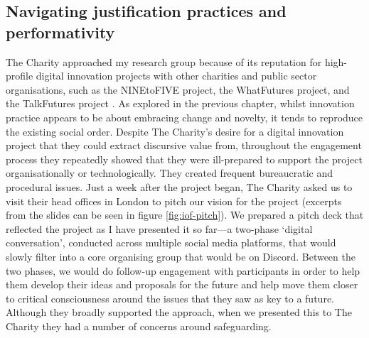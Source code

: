 \subsection{Navigating justification practices and performativity}
The Charity approached my research group because of its reputation for high-profile digital innovation projects with other charities and public sector organisations, such as the NINEtoFIVE project, the WhatFutures project, and the TalkFutures project \citep{lambton-howard_whatfutures:_2019, rainey_talkfutures_2020, abdulgalimov_designing_2020}. As explored in the previous chapter, whilst innovation practice appears to be about embracing change and novelty, it tends to reproduce the existing social order. Despite The Charity's desire for a digital innovation project that they could extract discursive value from, throughout the engagement process they repeatedly showed that they were ill-prepared to support the project organisationally or technologically. They created frequent bureaucratic and procedural issues. Just a week after the project began, The Charity asked us to visit their head offices in London to pitch our vision for the project (excerpts from the slides can be seen in figure \ref{fig:iof-pitch}). We prepared a pitch deck that reflected the project as I have presented it so far—a two-phase `digital conversation', conducted across multiple social media platforms, that would slowly filter into a core organising group that would be on Discord. Between the two phases, we would do follow-up engagement with participants in order to help them develop their ideas and proposals for the future and help move them closer to critical consciousness around the issues that they saw as key to a future. Although they broadly supported the approach, when we presented this to The Charity they had a number of concerns around safeguarding. 

